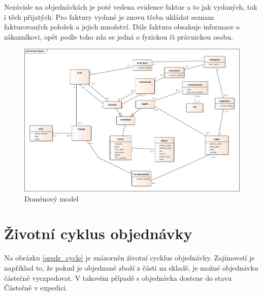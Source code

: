 \documentclass[thesis=B,czech]{FITthesis}[2012/06/26]
\begin{document}
	Nezávisle na objednávkách je poté vedena evidence faktur a to jak vydaných, tak i těch přijatých. Pro faktury vydané je znovu třeba ukládat seznam fakturovaných položek a jejich množství. Dále faktura obsahuje informace o zákazníkovi, opět podle toho zda se jedná o fyzickou či právnickou osobu. 
	
\begin{figure}
	\includegraphics[height=\textwidth, angle=90]{domain_model.png}
	\caption{Doménový model}\label{domain_model}
\end{figure}

\section{Životní cyklus objednávky}
	Na obrázku \ref{oredr_cycle} je znázorněn životní cycklus objednávky. Zajímovstí je například to, že pokud je objednané zboží z části na skladě, je možné objednávku částečně vyexpedovat. V takovém případě s objednávka dostene do stavu Částečně v expedici. 
	
\end{document}
